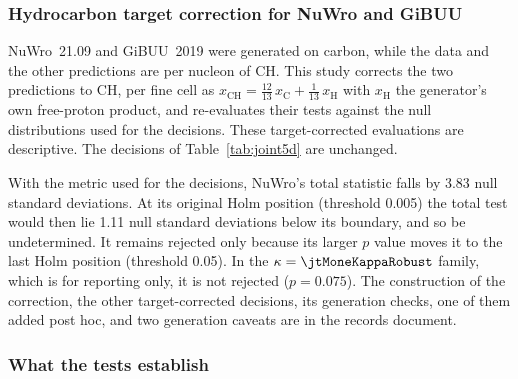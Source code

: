 
\subsubsection{Hydrocarbon target correction for NuWro and GiBUU}
\label{sec:joint5d-ch}

NuWro~21.09 and GiBUU~2019 were generated on carbon, while the data and the other predictions are per nucleon of CH. This study corrects the two predictions to CH, per fine cell as $x_{\mathrm{CH}}=\tfrac{12}{13}\,x_{\mathrm{C}}+\tfrac{1}{13}\,x_{\mathrm{H}}$ with $x_{\mathrm{H}}$ the generator's own free-proton product, and re-evaluates their tests against the null distributions used for the decisions. These target-corrected evaluations are descriptive. The decisions of Table~\ref{tab:joint5d} are unchanged.

With the metric used for the decisions, NuWro's total statistic falls by 3.83 null standard deviations. At its original Holm position (threshold 0.005) the total test would then lie 1.11 null standard deviations below its boundary, and so be undetermined. It remains rejected only because its larger $p$ value moves it to the last Holm position (threshold 0.05). In the $\kappa=\jtMoneKappaRobust$ family, which is for reporting only, it is not rejected ($p=0.075$). The construction of the correction, the other target-corrected decisions, its generation checks, one of them added post hoc, and two generation caveats are in the records document.




\subsubsection{What the tests establish}
\label{sec:joint5d-reading}

